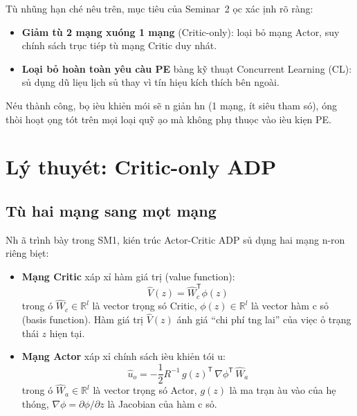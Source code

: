 \documentclass[12pt,a4paper]{article}
\newcommand{\R}{\mathbb{R}}
\newcommand{\T}{\mathsf{T}}
\begin{document}
T\`{u} nh\~{u}ng h\d{a}n ch\'{e} n\^{e}u tr\^{e}n, m\d{u}c ti\^{e}u c\h{u}a Seminar~2 \dj\uhorn{}\d{o}c x\'{a}c \dj\d{i}nh r\~{o} r\`{a}ng:
\begin{itemize}
    \item \textbf{Gi\h{a}m t\`{u} 2 m\d{a}ng xu\'{o}ng 1 m\d{a}ng} (Critic-only): lo\d{a}i b\h{o} m\d{a}ng Actor, suy ch\'{i}nh s\'{a}ch tr\d{u}c ti\'{e}p t\`{u} m\d{a}ng Critic duy nh\'{a}t.
    \item \textbf{Lo\d{a}i b\h{o} ho\`{a}n to\`{a}n y\^{e}u c\`{a}u PE} b\`{a}ng k\~{y} thu\d{a}t Concurrent Learning (CL): s\h{u} d\d{u}ng d\~{u} li\d{e}u l\d{i}ch s\h{u} thay v\`{i} t\'{i}n hi\d{e}u k\'{i}ch th\'{i}ch b\^{e}n ngo\`{a}i.
\end{itemize}

N\'{e}u th\`{a}nh c\^{o}ng, b\d{o} \dj i\`{e}u khi\h{e}n m\'{o}i s\~{e} \dj\ohorn{}n gi\h{a}n h\ohorn{}n (1 m\d{a}ng, \'{i}t si\^{e}u tham s\'{o}), \dj\'{o}ng th\`{o}i ho\d{a}t \dj\d{o}ng t\'{o}t tr\^{e}n m\d{o}i lo\d{a}i qu\~{y} \dj\d{a}o m\`{a} kh\^{o}ng ph\d{u} thu\d{o}c v\`{a}o \dj i\`{e}u ki\d{e}n PE.

\section{L\'{y} thuy\'{e}t: Critic-only ADP}

\subsection{T\`{u} hai m\d{a}ng sang m\d{o}t m\d{a}ng}

Nh\uhorn{} \dj\~{a} tr\`{i}nh b\`{a}y trong SM1, ki\'{e}n tr\'{u}c Actor-Critic ADP s\h{u} d\d{u}ng hai m\d{a}ng n\ohorn{}-ron ri\^{e}ng bi\d{e}t:

\begin{itemize}
    \item \textbf{M\d{a}ng Critic} x\'{a}p x\h{i} h\`{a}m gi\'{a} tr\d{i} (value function):
    \begin{equation}
        \hat{V}(z) = \hat{W}_c^\T \phi(z)
    \end{equation}
    trong \dj\'{o} $\hat{W}_c \in \R^l$ l\`{a} vector tr\d{o}ng s\'{o} Critic, $\phi(z) \in \R^l$ l\`{a} vector h\`{a}m c\ohorn{} s\h{o} (basis function). H\`{a}m gi\'{a} tr\d{i} $\hat{V}(z)$ \dj\'{a}nh gi\'{a} ``chi ph\'{i} t\uhorn{}\ohorn{}ng lai'' c\h{u}a vi\d{e}c \h{o} tr\d{a}ng th\'{a}i $z$ hi\d{e}n t\d{a}i.

    \item \textbf{M\d{a}ng Actor} x\'{a}p x\h{i} ch\'{i}nh s\'{a}ch \dj i\`{e}u khi\h{e}n t\'{o}i \uhorn{}u:
    \begin{equation}
        \hat{u}_o = -\frac{1}{2} R^{-1}\, g(z)^\T\, \nabla\phi^\T\, \hat{W}_a
    \end{equation}
    trong \dj\'{o} $\hat{W}_a \in \R^l$ l\`{a} vector tr\d{o}ng s\'{o} Actor, $g(z)$ l\`{a} ma tr\d{a}n \dj\`{a}u v\`{a}o c\h{u}a h\d{e} th\'{o}ng, $\nabla\phi = \partial\phi/\partial z$ l\`{a} Jacobian c\h{u}a h\`{a}m c\ohorn{} s\h{o}.
\end{itemize}
\end{document}
